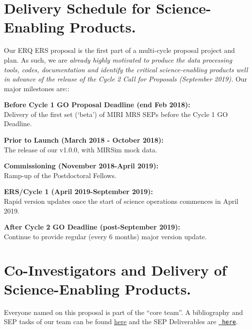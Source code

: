 \section*{Delivery Schedule for Science-Enabling Products.} 
\vspace{-6pt}
Our ERQ ERS proposal is the first part of a multi-cycle proposal
project and plan.  As such, we are {\it already highly motivated to
produce the data processing tools, codes, documentation and identify
the critical science-enabling products well in advance of the release
of the Cycle 2 Call for Proposals (September 2019).}
Our major milestones are::

\smallskip
\smallskip
\noindent
{\bf Before Cycle 1 GO Proposal Deadline (end Feb 2018):}\\ 
Delivery of the first set (‘beta’) of MIRI MRS SEPs before the Cycle 1 GO Deadline.

\smallskip
\smallskip
\noindent
 {\bf Prior to Launch (March 2018 - October 2018):}\\ 
The release of our v1.0.0, with MIRSim mock data. 

\smallskip
\smallskip
\noindent
{\bf Commissioning (November 2018-April 2019):}\\ 
Ramp-up of the Postdoctoral Fellows. 

\smallskip
\smallskip
\noindent
{\bf ERS/Cycle 1 (April 2019-September 2019):}\\ 
Rapid version updates once the start of science operations commences
in April 2019.  

\smallskip
\smallskip
\noindent
{\bf After Cycle 2 GO Deadline (post-September 2019):}\\ 
Continue to provide regular (every 6 months) major version update.


\section*{Co-Investigators and Delivery of Science-Enabling Products.}
\vspace{-6pt}
Everyone named on this proposal is part of the ``core team''.  A
bibliography and SEP tasks of our team can be found
\href{https://github.com/d80b2t/JWST_ERS/blob/master/Proposal/CoI_bios.tex}{here}
and the SEP Deliverables are
\href{https://github.com/d80b2t/JWST_ERS/tree/master/Deliverables}{\tt
here}.

%




